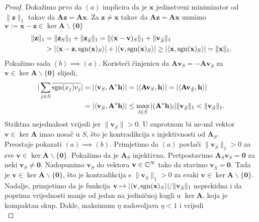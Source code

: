 \documentclass[a4paper,twoside,12pt]{memoir} %
\newcommand{\vect}[1]{\mathbf{#1}}
\renewcommand{\vec}{\vect}
\newcommand{\norm}[1]{\|{#1}\|}
\newcommand{\sgn}{\text{\normalfont{sgn}}}
\begin{document}
\begin{proof}
    Doka\v{z}imo prvo da $(a)$ implicira da je $\vec x$ jedinstveni minimizator od $\norm{\vec z}_1$ takav da $\vec{Az} = \vec{Ax}$. Za $\vec z \neq \vec x$ takav da $\vec{Az} = \vec {Ax}$ uzmimo $\vec v := \vec x - \vec z \in \ker \vec A \backslash \{\vec 0\}$
    \begin{align*}
        \norm{\vec z}_1 &= \norm{\vec z_S}_1 + \norm{\vec z_{\bar S} }_1 = \norm{(\vec x - \vec v)_S}_1 + \norm{\vec v_{\bar S}}_1  \\
        &> |\langle \vec x - \vec z, \sgn(\vec x)_S \rangle | + |\langle \vec v, \sgn(\vec x)_S \rangle| \geq |\langle \vec x, \sgn(\vec x)_S  \rangle| = \norm{\vec x}_1.
    \end{align*}
    \indent Poka\v{z}imo sada $(b) \implies (a)$. Koriste\'ci \v{c}injenicu da $\vec{Av}_S = - \vec {Av}_{\bar S}$ za $\vec v \in \ker \vec A \backslash \{\vec 0\}$ slijedi,
    \begin{align*}
        |\sum_{j \in S} \overline{\sgn(x_j)v_j}| &= |\langle \vec v_S, \vec A^* \vec h \rangle|  = |\langle \vec{Av}_S, \vec h \rangle| = |\langle \vec{Av}_{\bar S}, \vec h\rangle| \\ 
        &= |\langle \vec v_{\bar S}, \vec{A}^*\vec h \rangle| \leq \max_{l \in \bar S} |(\vec A^* \vec h)_l| \norm{\vec v_{\bar S}}_1 < \norm{\vec v_{\bar S}}_1.
    \end{align*}
    Striktna nejednakost vrijedi jer $\norm{\vec v_{\bar S}} > 0$. U suprotnom bi ne-nul vektor $\vec v \in \ker \vec A$ imao nosa\v{c} u $S$, \v{s}to je kontradikcija s injektivnosti od $\vec A_S$.\\
    \indent Preostaje pokazati $(a) \implies (b)$. Primjetimo da $(a)$ povla\v{c}i $\norm{\vec v_{\bar S}}_1 > 0$ za sve $\vec v \in \ker \vec A \backslash \{\vec 0\}$. Poka\v{z}imo da je $\vec A_S$ injektivna. Pretpostavimo $\vec A_S \vec v_S = \vec 0$ za neki $\vec v_S \neq \vec 0$. Nadopunimo $\vec v_S$ do vektora $\vec v \in \C^N$ tako da stavimo $\vec v_{\bar S} = \vec 0$. Tada je $\vec v \in \ker \vec A \backslash \{\vec 0\}$, \v{s}to je kontradikcija s $\norm{\vec v_{\bar S}}_1 > 0$ za svaki $\vec v \in \ker \vec A \backslash \{\vec 0\}$. Nadalje, primjetimo da je funkcija $\vec v \mapsto |\langle \vec v, \sgn(\vec x)_S \rangle|/ \norm{\vec v_{\bar S}}_1$ neprekidna i da poprima vrijednosti manje od jedan na jedini\v{c}noj kugli u $\ker \vec A$, koja je kompaktan skup. Dakle, maksimum $\eta$ zadovoljava $\eta < 1$ i vrijedi 
    \begin{equation*}

\end{equation*}
\end{proof}
\end{document}
